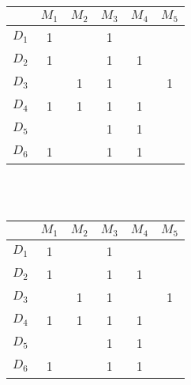 \documentclass[12pt]{article}
\begin{document}
\begin{tabular}{|c|c|c|c|c|c|}
\hline
      & $M_1$                    & $M_2$                    & $M_3$                    & $M_4$                    & $M_5$                    \\ \hline
$D_1$ & {\color[HTML]{3166FF} 1} & {\color[HTML]{000000} }  & {\color[HTML]{FE0000} 1} & {\color[HTML]{000000} }  & {\color[HTML]{000000} }  \\ \hline
$D_2$ & {\color[HTML]{FE0000} 1} & {\color[HTML]{000000} }  & {\color[HTML]{000000} 1} & {\color[HTML]{000000} 1} & {\color[HTML]{000000} }  \\ \hline
$D_3$ & {\color[HTML]{000000} }  & {\color[HTML]{FE0000} 1} & {\color[HTML]{FE0000} 1} & {\color[HTML]{000000} }  & {\color[HTML]{3166FF} 1} \\ \hline
$D_4$ & {\color[HTML]{FE0000} 1} & {\color[HTML]{3166FF} 1} & {\color[HTML]{FE0000} 1} & {\color[HTML]{FE0000} 1} & {\color[HTML]{000000} }  \\ \hline
$D_5$ & {\color[HTML]{000000} }  & {\color[HTML]{000000} }  & {\color[HTML]{000000} 1} & {\color[HTML]{000000} 1} & {\color[HTML]{000000} }  \\ \hline
$D_6$ & {\color[HTML]{FE0000} 1} & {\color[HTML]{000000} }  & {\color[HTML]{000000} 1} & {\color[HTML]{000000} 1} & {\color[HTML]{000000} }  \\ \hline
\end{tabular}\\
\\
\begin{tabular}{|c|c|c|c|c|c|}
\hline
      & $M_1$                    & $M_2$                    & $M_3$                    & $M_4$                    & $M_5$                    \\ \hline
$D_1$ & {\color[HTML]{3166FF} 1} & {\color[HTML]{000000} }  & {\color[HTML]{FE0000} 1} & {\color[HTML]{000000} }  & {\color[HTML]{000000} }  \\ \hline
$D_2$ & {\color[HTML]{FE0000} 1} & {\color[HTML]{000000} }  & {\color[HTML]{3166FF} 1} & {\color[HTML]{FE0000} 1} & {\color[HTML]{000000} }  \\ \hline
$D_3$ & {\color[HTML]{000000} }  & {\color[HTML]{FE0000} 1} & {\color[HTML]{FE0000} 1} & {\color[HTML]{000000} }  & {\color[HTML]{3166FF} 1} \\ \hline
$D_4$ & {\color[HTML]{FE0000} 1} & {\color[HTML]{3166FF} 1} & {\color[HTML]{FE0000} 1} & {\color[HTML]{FE0000} 1} & {\color[HTML]{000000} }  \\ \hline
$D_5$ & {\color[HTML]{000000} }  & {\color[HTML]{000000} }  & {\color[HTML]{FE0000} 1} & {\color[HTML]{000000} 1} & {\color[HTML]{000000} }  \\ \hline
$D_6$ & {\color[HTML]{FE0000} 1} & {\color[HTML]{000000} }  & {\color[HTML]{FE0000} 1} & {\color[HTML]{000000} 1} & {\color[HTML]{000000} }  \\ \hline
\end{tabular}
\end{document}
